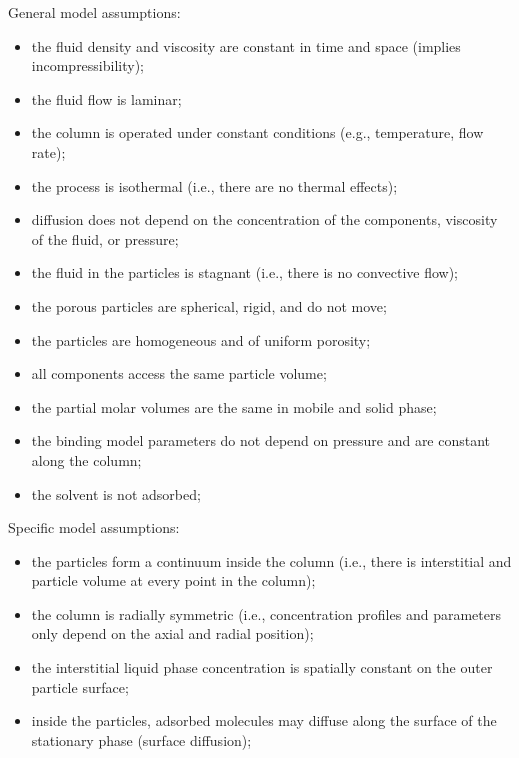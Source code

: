 \documentclass{article}
\begin{document}
General model assumptions:
\begin{itemize}
    \item the fluid density and viscosity are constant in time and space (implies incompressibility);
    \item the fluid flow is laminar;
    \item the column is operated under constant conditions (e.g., temperature, flow rate);
    \item the process is isothermal (i.e., there are no thermal effects);
    \item diffusion does not depend on the concentration of the components, viscosity of the fluid, or pressure;
    \item the fluid in the particles is stagnant (i.e., there is no convective flow);
    \item the porous particles are spherical, rigid, and do not move;
    \item the particles are homogeneous and of uniform porosity;
    \item all components access the same particle volume;
    \item the partial molar volumes are the same in mobile and solid phase;
    \item the binding model parameters do not depend on pressure and are constant along the column;
    \item the solvent is not adsorbed;
\end{itemize}

Specific model assumptions:
\begin{itemize}
    \item the particles form a continuum inside the column (i.e., there is interstitial and particle volume at every point in the column);
    \item the column is radially symmetric (i.e., concentration profiles and parameters only depend on the axial and radial position);
    \item the interstitial liquid phase concentration is spatially constant on the outer particle surface;
    \item inside the particles, adsorbed molecules may diffuse along the surface of the stationary phase (surface diffusion);
\end{itemize}
\end{document}
